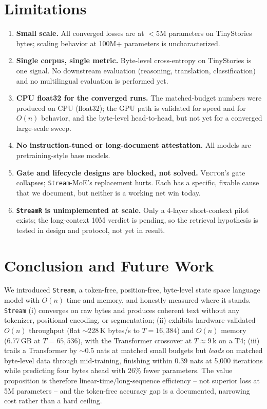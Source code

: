 \documentclass[11pt]{article}
\newcommand{\Stream}{\texttt{Stream}}
\newcommand{\StreamR}{\texttt{StreamR}}
\newcommand{\Vector}{{\scshape Vector}}
\begin{document}
\section{Limitations}\label{sec:limits}

\begin{enumerate}
  \item \textbf{Small scale.} All converged losses are at $<$5M parameters on
        TinyStories bytes; scaling behavior at 100M+ parameters is
        uncharacterized.
  \item \textbf{Single corpus, single metric.} Byte-level cross-entropy on
        TinyStories is one signal. No downstream evaluation (reasoning,
        translation, classification) and no multilingual evaluation is
        performed yet.
  \item \textbf{CPU float32 for the converged runs.} The matched-budget numbers
        were produced on CPU (float32); the GPU path is validated for speed and
        for $O(n)$ behavior, and the byte-level head-to-head, but not yet for a
        converged large-scale sweep.
  \item \textbf{No instruction-tuned or long-document attestation.} All models
        are pretraining-style base models.
  \item \textbf{Gate and lifecycle designs are blocked, not solved.} \Vector{}'s
        gate collapses; \Stream{}-MoE's replacement hurts. Each has a specific,
        fixable cause that we document, but neither is a working net win today.
  \item \textbf{\StreamR{} is unimplemented at scale.} Only a 4-layer short-context
        pilot exists; the long-context 10M verdict is pending, so the retrieval
        hypothesis is tested in design and protocol, not yet in result.
\end{enumerate}

\section{Conclusion and Future Work}\label{sec:future}

We introduced \Stream{}, a token-free, position-free, byte-level state space
language model with $O(n)$ time and memory, and honestly measured where it
stands. \Stream{} (i) converges on raw bytes and produces coherent text without
any tokenizer, positional encoding, or segmentation; (ii) exhibits
hardware-validated $O(n)$ throughput (flat $\sim$228\,K bytes/s to $T{=}16{,}384$)
and $O(n)$ memory (6.77\,GB at $T{=}65{,}536$), with the Transformer crossover
at $T\approx9$\,k on a T4; (iii) trails a Transformer by $\sim$0.5 nats at
matched small budgets but \emph{leads} on matched byte-level data through
mid-training, finishing within 0.39 nats at 5{,}000 iterations while predicting
four bytes ahead with 26\% fewer parameters. The value proposition is therefore
linear-time/long-sequence efficiency -- not superior loss at 5M parameters --
and the token-free accuracy gap is a documented, narrowing cost rather than a
hard ceiling.
\end{document}
